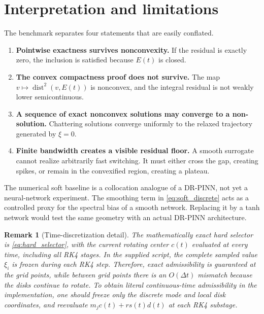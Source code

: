 \documentclass[11pt]{article}
\newtheorem{remark}[proposition]{Remark}
\newcommand{\dist}{\operatorname{dist}}
\begin{document}
\section{Interpretation and limitations}

The benchmark separates four statements that are easily conflated.

\begin{enumerate}[label=(\roman*)]
\item \textbf{Pointwise exactness survives nonconvexity.} If the residual is exactly zero, the inclusion is satisfied because $E(t)$ is closed.

\item \textbf{The convex compactness proof does not survive.} The map $v\mapsto\dist^2(v,E(t))$ is nonconvex, and the integral residual is not weakly lower semicontinuous.

\item \textbf{A sequence of exact nonconvex solutions may converge to a non-solution.} Chattering solutions converge uniformly to the relaxed trajectory generated by $\xi=0$.

\item \textbf{Finite bandwidth creates a visible residual floor.} A smooth surrogate cannot realize arbitrarily fast switching. It must either cross the gap, creating spikes, or remain in the convexified region, creating a plateau.
\end{enumerate}

The numerical soft baseline is a collocation analogue of a DR-PINN, not yet a neural-network experiment. The smoothing term in \eqref{eq:soft_discrete} acts as a controlled proxy for the spectral bias of a smooth network. Replacing it by a tanh network would test the same geometry with an actual DR-PINN architecture.

\begin{remark}[Time-discretization detail]
The mathematically exact hard selector is \eqref{eq:hard_selector}, with the current rotating center $c(t)$ evaluated at every time, including all RK4 stages. In the supplied script, the complete sampled value $\xi_i$ is frozen during each RK4 step. Therefore, exact admissibility is guaranteed at the grid points, while between grid points there is an $O(\Delta t)$ mismatch because the disks continue to rotate. To obtain literal continuous-time admissibility in the implementation, one should freeze only the discrete mode and local disk coordinates, and reevaluate $m_jc(t)+r s(t)d(t)$ at each RK4 substage.
\end{remark}
\end{document}
